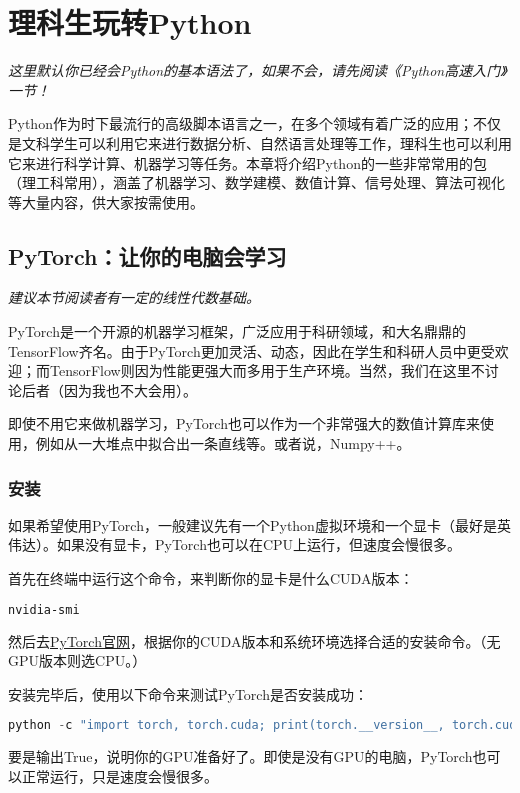 \documentclass[../main.tex]{subfiles}
\begin{document}
\chapter{理科生玩转Python}\label{chap:python-advanced}
\begin{flushright}
  \emph{这里默认你已经会Python的基本语法了，如果不会，请先阅读《Python高速入门》一节！}
\end{flushright}

Python作为时下最流行的高级脚本语言之一，在多个领域有着广泛的应用；不仅是文科学生可以利用它来进行数据分析、自然语言处理等工作，理科生也可以利用它来进行科学计算、机器学习等任务。本章将介绍Python的一些非常常用的包（理工科常用），涵盖了机器学习、数学建模、数值计算、信号处理、算法可视化等大量内容，供大家按需使用。

\section{PyTorch：让你的电脑会学习}
\begin{flushright}
  \emph{建议本节阅读者有一定的线性代数基础。}
\end{flushright}

PyTorch是一个开源的机器学习框架，广泛应用于科研领域，和大名鼎鼎的TensorFlow齐名。由于PyTorch更加灵活、动态，因此在学生和科研人员中更受欢迎；而TensorFlow则因为性能更强大而多用于生产环境。当然，我们在这里不讨论后者（因为我也不大会用）。

即使不用它来做机器学习，PyTorch也可以作为一个非常强大的数值计算库来使用，例如从一大堆点中拟合出一条直线等。或者说，Numpy++。

\subsection{安装}

如果希望使用PyTorch，一般建议先有一个Python虚拟环境和一个显卡（最好是英伟达）。如果没有显卡，PyTorch也可以在CPU上运行，但速度会慢很多。

首先在终端中运行这个命令，来判断你的显卡是什么CUDA版本：
\begin{lstlisting}[language=bash]
nvidia-smi
\end{lstlisting}

然后去\href{https://pytorch.org/get-started/locally/}{PyTorch官网}，根据你的CUDA版本和系统环境选择合适的安装命令。（无GPU版本则选CPU。）

安装完毕后，使用以下命令来测试PyTorch是否安装成功：
\begin{lstlisting}[language=python]
python -c "import torch, torch.cuda; print(torch.__version__, torch.cuda.is_available())"
\end{lstlisting}
要是输出True，说明你的GPU准备好了。即使是没有GPU的电脑，PyTorch也可以正常运行，只是速度会慢很多。
\end{document}
